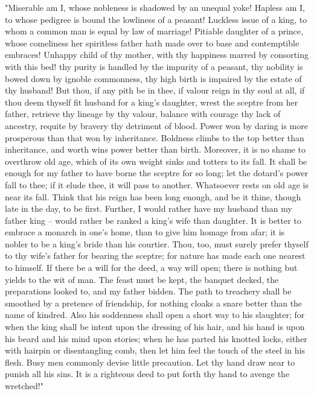 \documentclass[10pt,a4paper]{report}
\begin{document}
"Miserable am I, whose nobleness is shadowed by an unequal yoke! Hapless am I, to whose pedigree is bound the lowliness of a peasant! Luckless issue of a king, to whom a common man is equal by law of marriage! Pitiable daughter of a prince, whose comeliness her spiritless father hath made over to base and contemptible embraces! Unhappy child of thy mother, with thy happiness marred by consorting with this bed! thy purity is handled by the impurity of a peasant, thy nobility is bowed down by ignoble commonness, thy high birth is impaired by the estate of thy husband! But thou, if any pith be in thee, if valour reign in thy soul at all, if thou deem thyself fit husband for a king's daughter, wrest the sceptre from her father, retrieve thy lineage by thy valour, balance with courage thy lack of ancestry, requite by bravery thy detriment of blood. Power won by daring is more prosperous than that won by inheritance. Boldness climbs to the top better than inheritance, and worth wins power better than birth. Moreover, it is no shame to overthrow old age, which of its own weight sinks and totters to its fall. It shall be enough for my father to have borne the sceptre for so long; let the dotard's power fall to thee; if it elude thee, it will pass to another. Whatsoever rests on old age is near its fall. Think that his reign has been long enough, and be it thine, though late in the day, to be first. Further, I would rather have my husband than my father king -- would rather be ranked a king's wife than daughter. It is better to embrace a monarch in one's home, than to give him homage from afar; it is nobler to be a king's bride than his courtier. Thou, too, must surely prefer thyself to thy wife's father for bearing the sceptre; for nature has made each one nearest to himself. If there be a will for the deed, a way will open; there is nothing but yields to the wit of man. The feast must be kept, the banquet decked, the preparations looked to, and my father bidden. The path to treachery shall be smoothed by a pretence of friendship, for nothing cloaks a snare better than the name of kindred. Also his soddenness shall open a short way to his slaughter; for when the king shall be intent upon the dressing of his hair, and his hand is upon his beard and his mind upon stories; when he has parted his knotted locks, either with hairpin or disentangling comb, then let him feel the touch of the steel in his flesh. Busy men commonly devise little precaution. Let thy hand draw near to punish all his sins. It is a righteous deed to put forth thy hand to avenge the wretched!"\\
\end{document}
